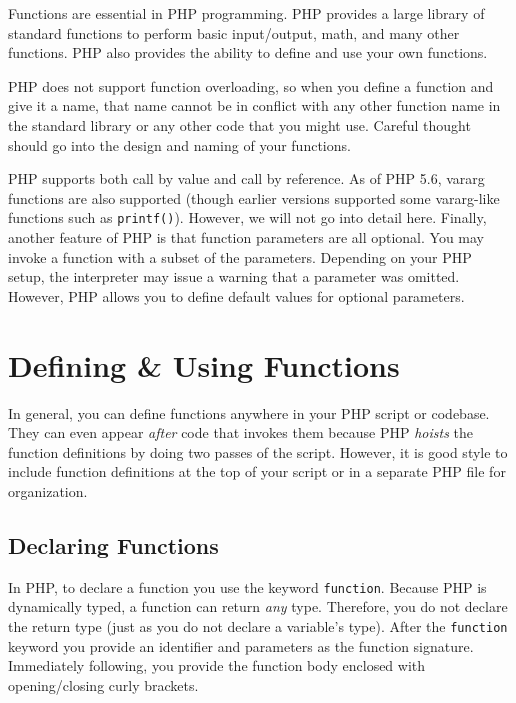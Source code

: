 

Functions are essential in PHP programming.  
PHP provides a large library of standard 
functions to perform basic input/output, math, and many 
other functions.  PHP also provides the ability to define 
and use your own functions.

PHP does not support function overloading, so when you
define a function and give it a name, that name cannot be
in conflict with any other function name in the standard library
or any other code that you might use.  Careful 
thought should go into the design and naming of your functions.  

PHP supports both call by value and call by reference.
As of PHP 5.6, vararg functions are also supported (though
earlier versions supported some vararg-like functions 
such as \texttt{printf()}).  However, we will not
go into detail here.  Finally, another feature of PHP is that
function parameters are all optional.  You may invoke
a function with a subset of the parameters.  Depending on
your PHP setup, the interpreter may issue a warning that a parameter
was omitted.  However, PHP allows you to define default 
values for optional parameters.

 \section{Defining \& Using Functions}

In general, you can define functions anywhere in your PHP script
or codebase.  They can even appear \emph{after} code that
invokes them because PHP  
 \emph{hoists} the function
definitions by doing two passes of the script.  However, it is good
style to include function definitions at the top of your script or
in a separate PHP file for organization.

\subsection{Declaring Functions}

In PHP, to declare a function you use the keyword 
\texttt{function}.  Because PHP is dynamically typed, 
a function can return \emph{any} type.  Therefore, you do
not declare the return type (just as you do not declare a variable's
type).  After the \texttt{function} keyword you
provide an identifier and parameters as the function signature.
Immediately following, you provide the function body enclosed
with opening/closing curly brackets.  

